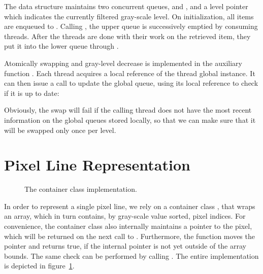 The  data structure maintains two concurrent queues,
 and , and a level pointer which indicates
the currently filtered gray-scale level. On initialization, all items are
enqueued to . Calling , the upper queue is
successively emptied by consuming threads. After the threads are done with their
work on the retrieved item, they put it into the lower queue through
.

Atomically swapping and gray-level decrease is implemented in the auxiliary
function . Each thread acquires a local reference
of the thread global  instance. It can then issue a call to
update the global queue, using its local reference to check if it is up to date:



Obviously, the swap will fail if the calling thread does not have the most
recent information on the global queues stored locally, so that we can make sure
that it will be swapped only once per level.

\section{Pixel Line Representation}
\label{sec:pixel-line}

\begin{figure}
  \centering
  

  \caption{The  container class implementation.}
  \label{fig:line-class}
\end{figure}

In order to represent a single pixel line, we rely on a container class
, that wraps an array, which in turn contains, by gray-scale
value sorted, pixel indices. For convenience, the container class also
internally maintains a pointer to the pixel, which will be returned on the next
call to . Furthermore, the function 
moves the pointer and returns true, if the internal pointer is not yet outside
of the array bounds. The same check can be performed by calling
. The entire implementation is depicted in
figure~\ref{fig:line-class}.

